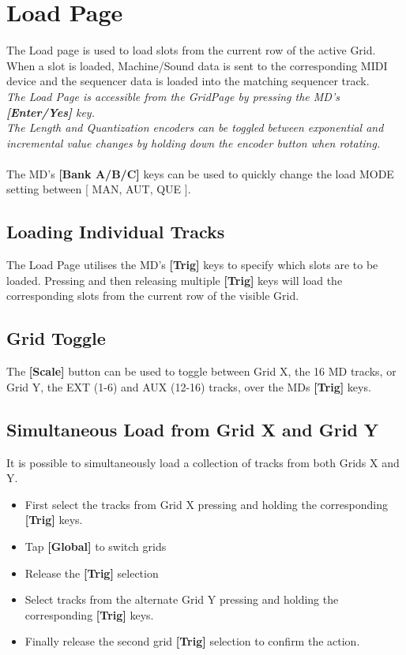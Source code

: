 \chapter{Load Page}
The Load page is used to load slots from the current row of the active Grid. When a slot is loaded, Machine/Sound data is sent to the corresponding MIDI device and the sequencer data is loaded into the matching sequencer track.
\\
\textit{The Load Page is accessible from the GridPage by pressing the MD's \textbf{[Enter/Yes]} key.}
\\
\textit{The Length and Quantization encoders can be toggled between exponential and incremental value changes by holding down the encoder button when rotating.}
\\\\
The MD's \textbf{[Bank A/B/C]} keys can be used to quickly change the load MODE setting between [ MAN, AUT, QUE ].
\newpage
\section{Loading Individual Tracks}
The Load Page utilises the MD's \textbf{[Trig]} keys to specify which slots are to be loaded. Pressing and then releasing multiple \textbf{[Trig]} keys will load the corresponding slots from the current row of the visible Grid.
\section{Grid Toggle}
The \textbf{[Scale]} button can be used to toggle between Grid X, the 16 MD tracks, or Grid Y, the EXT (1-6) and AUX (12-16) tracks, over the MDs \textbf{[Trig]} keys.
\section{Simultaneous Load from Grid X and Grid Y}
It is possible to simultaneously load a collection of tracks from both Grids X and Y. 
\begin{itemize}
\item First select the tracks from Grid X pressing and holding the corresponding \textbf{[Trig]} keys.
\item Tap \textbf{[Global]} to switch grids
\item Release the \textbf{[Trig]} selection
\item Select tracks from the alternate Grid Y pressing and holding the corresponding \textbf{[Trig]} keys. 
\item Finally release the second grid \textbf{[Trig]} selection to confirm the action. 
\end{itemize}

